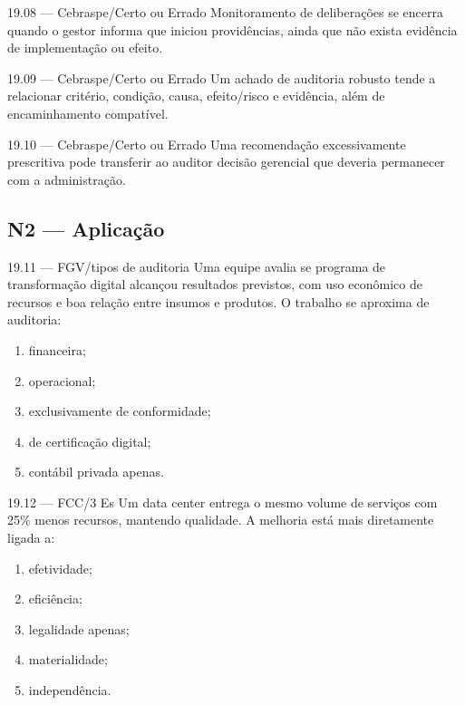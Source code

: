 \begin{questao}{ 19.08 — Cebraspe/Certo ou Errado}
Monitoramento de deliberações se encerra quando o gestor informa que iniciou providências, ainda que não exista evidência de implementação ou efeito.
\end{questao}

\begin{questao}{ 19.09 — Cebraspe/Certo ou Errado}
Um achado de auditoria robusto tende a relacionar critério, condição, causa, efeito/risco e evidência, além de encaminhamento compatível.
\end{questao}

\begin{questao}{ 19.10 — Cebraspe/Certo ou Errado}
Uma recomendação excessivamente prescritiva pode transferir ao auditor decisão gerencial que deveria permanecer com a administração.
\end{questao}

\subsection*{N2 — Aplicação}

\begin{questao}{ 19.11 — FGV/tipos de auditoria}
Uma equipe avalia se programa de transformação digital alcançou resultados previstos, com uso econômico de recursos e boa relação entre insumos e produtos. O trabalho se aproxima de auditoria:
\begin{enumerate}[label=\Alph*)]
\item financeira;
\item operacional;
\item exclusivamente de conformidade;
\item de certificação digital;
\item contábil privada apenas.
\end{enumerate}
\end{questao}

\begin{questao}{ 19.12 — FCC/3 Es}
Um data center entrega o mesmo volume de serviços com 25\% menos recursos, mantendo qualidade. A melhoria está mais diretamente ligada a:
\begin{enumerate}[label=\Alph*)]
\item efetividade;
\item eficiência;
\item legalidade apenas;
\item materialidade;
\item independência.
\end{enumerate}
\end{questao}

